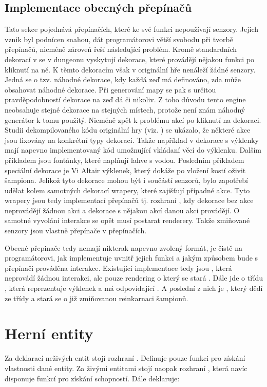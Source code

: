 \subsection{Implementace obecných přepínačů}
Tato sekce pojednává přepínačích, které ke své funkci nepoužívají senzory. Jejich vznik byl podnícen snahou, dát
programátorovi větší svobodu při tvorbě přepínačů, nicméně zároveň řeší následující problém. Kromě standardních
dekorací v se v dungeonu vyskytují dekorace, které provádějí nějakou funkci po kliknutí na ně. K těmto dekoracím však v originální
hře nenáleží žádné senzory. Jedná se o tzv. náhodné dekorace, kdy každá zeď má definováno, zda může obsahovat náhodné dekorace.
Při generování mapy se pak s určitou pravděpodobností dekorace na zeď dá či nikoliv. Z toho důvodu tento engine
neobsahuje stejné dekorace na stejných místech, protože není znám náhodný generátor k tomu použitý. Nicméně zpět 
k problému akcí po kliknutí na dekoraci. Studii dekompilovaného kódu originální hry  (viz. \citet{DMDekompilation}) se ukázalo,
že některé akce jsou fixovány na konkrétní typy dekorací. Takže například v dekorace s výklenky mají napevno implementovaný 
kód umožnující vkládaní věcí do výklenku. Dalším příkladem jsou fontánky, které naplňují lahve s vodou. Posledním příkladem
speciální dekorace je Vi Altair výklenek, který dokáže po vložení kostí oživit šampiona. Jelikož tyto dekorace
mohou být i součástí senzorů, bylo zapotřebí udělat kolem samotných dekorací wrapery, které zajišťují případné akce.
Tyto wrapery jsou tedy implementací přepínačů tj. rozhraní , kdy dekorace bez akce neprovádějí žádnou akci a dekorace s nějakou akcí
danou akci provádějí. O samotné vyvolání interakce se opět musí postarat renderery. Takže zmiňované senzory jsou vlastně přepínače v přepínačích. 

Obecné přepinače tedy nemají nikterak napevno zvolený formát, je čistě na programátorovi, jak implementuje uvnitř jejich funkci a 
jakým způsobem bude s přepínači prováděna interakce. Existující implementace tedy jsou , která
neprovádí žádnou interakci, ale pouze rendering o který se stará . Dále jde o třídu ,
která reprezentuje výklenek a má odpovídající . A poslední z nich je , který dědí
ze třídy  a stará se o již zmiňovanou reinkarnaci šampionů.
 
\section{Herní entity}
Za deklarací neživých entit stojí rozhraní . Definuje pouze funkci pro získání vlastnosti dané entity.
Za živými entitami stojí naopak rozhraní , která navíc disponuje funkcí pro získání schopností. Dále
deklaruje:

